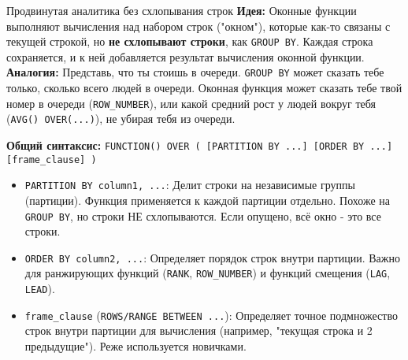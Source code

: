 \begin{alerttextbox}{Продвинутая аналитика без схлопывания строк}
    \textbf{Идея:} Оконные функции выполняют вычисления над набором строк ("окном"), которые как-то связаны с текущей строкой, но \textbf{не схлопывают строки}, как \texttt{GROUP BY}. Каждая строка сохраняется, и к ней добавляется результат вычисления оконной функции.
    \textbf{Аналогия:} Представь, что ты стоишь в очереди. \texttt{GROUP BY} может сказать тебе только, сколько всего людей в очереди. Оконная функция может сказать тебе твой номер в очереди (\texttt{ROW\_NUMBER}), или какой средний рост у людей вокруг тебя (\texttt{AVG() OVER(...)}), не убирая тебя из очереди.

    \textbf{Общий синтаксис:}
    \texttt{FUNCTION() OVER ( [PARTITION BY ...] [ORDER BY ...] [frame\_clause] )}
    \begin{itemize}
        \item \texttt{PARTITION BY column1, ...}: Делит строки на независимые группы (партиции). Функция применяется к каждой партиции отдельно. Похоже на \texttt{GROUP BY}, но строки НЕ схлопываются. Если опущено, всё окно - это все строки.
        \item \texttt{ORDER BY column2, ...}: Определяет порядок строк внутри партиции. Важно для ранжирующих функций (\texttt{RANK}, \texttt{ROW\_NUMBER}) и функций смещения (\texttt{LAG}, \texttt{LEAD}).
        \item \texttt{frame\_clause} (\texttt{ROWS/RANGE BETWEEN ...}): Определяет точное подмножество строк внутри партиции для вычисления (например, "текущая строка и 2 предыдущие"). Реже используется новичками.
    \end{itemize}
\end{alerttextbox}

